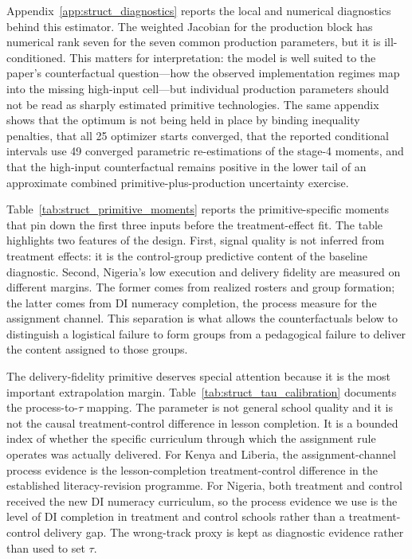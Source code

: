 \documentclass[11pt]{article}
\begin{document}


Appendix~\ref{app:struct_diagnostics} reports the local and numerical diagnostics behind this estimator. The weighted Jacobian for the production block has numerical rank seven for the seven common production parameters, but it is ill-conditioned. This matters for interpretation: the model is well suited to the paper's counterfactual question---how the observed implementation regimes map into the missing high-input cell---but individual production parameters should not be read as sharply estimated primitive technologies. The same appendix shows that the optimum is not being held in place by binding inequality penalties, that all 25 optimizer starts converged, that the reported conditional intervals use 49 converged parametric re-estimations of the stage-4 moments, and that the high-input counterfactual remains positive in the lower tail of an approximate combined primitive-plus-production uncertainty exercise.

Table~\ref{tab:struct_primitive_moments} reports the primitive-specific moments that pin down the first three inputs before the treatment-effect fit. The table highlights two features of the design. First, signal quality is not inferred from treatment effects: it is the control-group predictive content of the baseline diagnostic. Second, Nigeria's low execution and delivery fidelity are measured on different margins. The former comes from realized rosters and group formation; the latter comes from DI numeracy completion, the process measure for the assignment channel. This separation is what allows the counterfactuals below to distinguish a logistical failure to form groups from a pedagogical failure to deliver the content assigned to those groups.



The delivery-fidelity primitive deserves special attention because it is the most important extrapolation margin. Table~\ref{tab:struct_tau_calibration} documents the process-to-$\tau$ mapping. The parameter is not general school quality and it is not the causal treatment-control difference in lesson completion. It is a bounded index of whether the specific curriculum through which the assignment rule operates was actually delivered. For Kenya and Liberia, the assignment-channel process evidence is the lesson-completion treatment-control difference in the established literacy-revision programme. For Nigeria, both treatment and control received the new DI numeracy curriculum, so the process evidence we use is the level of DI completion in treatment and control schools rather than a treatment-control delivery gap. The wrong-track proxy is kept as diagnostic evidence rather than used to set $\tau$.
\end{document}
